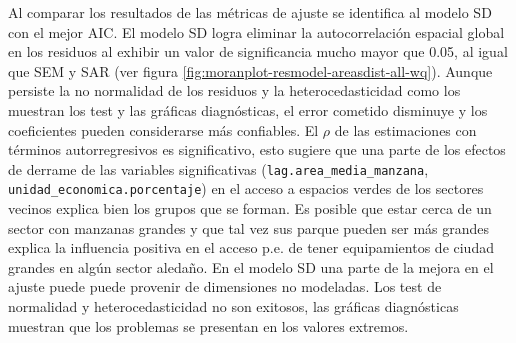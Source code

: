\documentclass[12pt,]{book}
\begin{document}
Al comparar los resultados de las métricas de ajuste se identifica al
modelo SD con el mejor AIC. El modelo SD logra eliminar la
autocorrelación espacial global en los residuos al exhibir un valor de
significancia mucho mayor que 0.05, al igual que SEM y SAR (ver figura
\ref{fig:moranplot-resmodel-areasdist-all-wq}). Aunque persiste la no
normalidad de los residuos y la heterocedasticidad como los muestran los
test y las gráficas diagnósticas, el error cometido disminuye y los
coeficientes pueden considerarse más confiables. El \(\rho\) de las
estimaciones con términos autorregresivos es significativo, esto sugiere
que una parte de los efectos de derrame de las variables significativas
(\texttt{lag.area\_media\_manzana},
\texttt{unidad\_economica.porcentaje}) en el acceso a espacios verdes de
los sectores vecinos explica bien los grupos que se forman. Es posible
que estar cerca de un sector con manzanas grandes y que tal vez sus
parque pueden ser más grandes explica la influencia positiva en el
acceso p.e. de tener equipamientos de ciudad grandes en algún sector
aledaño. En el modelo SD una parte de la mejora en el ajuste puede puede
provenir de dimensiones no modeladas. Los test de normalidad y
heterocedasticidad no son exitosos, las gráficas diagnósticas muestran
que los problemas se presentan en los valores extremos.
\end{document}

